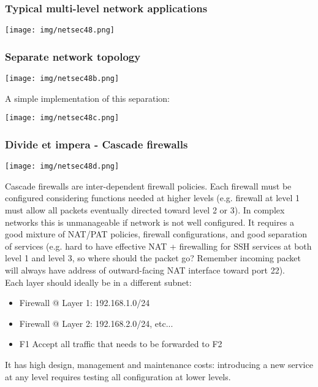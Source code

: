 \documentclass[a4paper, 10pt, titlepage]{article}
\begin{document}
\subsubsection*{Typical multi-level network applications}
\begin{center}
	\texttt{[image: img/netsec48.png]}
\end{center}
\subsubsection*{Separate network topology}
\begin{center}
	\texttt{[image: img/netsec48b.png]}
\end{center}
A simple implementation of this separation:
\begin{center}
	\texttt{[image: img/netsec48c.png]}
\end{center}

\subsubsection*{Divide et impera - Cascade firewalls}
\begin{center}
	\texttt{[image: img/netsec48d.png]}
\end{center}
Cascade firewalls are inter-dependent firewall policies. Each firewall must be configured considering functions needed at higher levels (e.g. firewall at level 1 must allow all packets eventually directed toward level 2 or 3). In complex networks this is unmanageable if network is not well configured. It requires a good mixture of NAT/PAT policies, firewall configurations, and good separation of services (e.g. hard to have effective NAT + firewalling for SSH services at both level 1 and level 3, so where should the packet go? Remember incoming packet will always have address of outward-facing NAT interface toward port 22).\medskip\\ Each layer should ideally be in a different subnet:
\begin{itemize}
	\item Firewall @ Layer 1: 192.168.1.0/24
	\item Firewall @ Layer 2: 192.168.2.0/24, etc...
	\item F1 Accept all traffic that needs to be forwarded to F2
\end{itemize}
It has high design, management and maintenance costs: introducing a new service at any level requires testing all configuration at lower levels.
\end{document}
